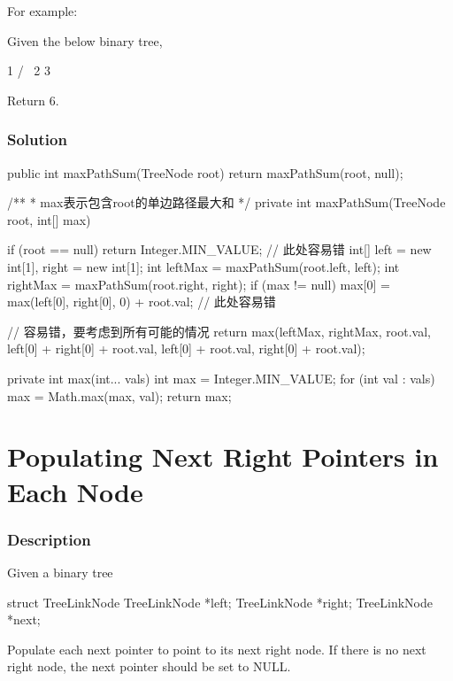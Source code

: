 For example:

Given the below binary tree,
\begin{Code}
       1
      / \
     2   3
\end{Code}

Return 6.

\subsubsection{Solution}

\begin{Code}
public int maxPathSum(TreeNode root) {
    return maxPathSum(root, null);
}

/**
 * max表示包含root的单边路径最大和
 */
private int maxPathSum(TreeNode root, int[] max) {
    if (root == null) {
        return Integer.MIN_VALUE;  // 此处容易错
    }
    int[] left = new int[1], right = new int[1];
    int leftMax = maxPathSum(root.left, left);
    int rightMax = maxPathSum(root.right, right);
    if (max != null) {
        max[0] = max(left[0], right[0], 0) + root.val; // 此处容易错
    }

    // 容易错，要考虑到所有可能的情况
    return max(leftMax, rightMax, root.val, left[0] + right[0] + root.val,
            left[0] + root.val, right[0] + root.val);
}

private int max(int... vals) {
    int max = Integer.MIN_VALUE;
    for (int val : vals) {
        max = Math.max(max, val);
    }
    return max;
}
\end{Code}

\newpage

\section{Populating Next Right Pointers in Each Node} %

\subsubsection{Description}

Given a binary tree
\begin{Code}
    struct TreeLinkNode {
      TreeLinkNode *left;
      TreeLinkNode *right;
      TreeLinkNode *next;
    }
\end{Code}

Populate each next pointer to point to its next right node. If there is no next right node, the next pointer should be set to NULL.

